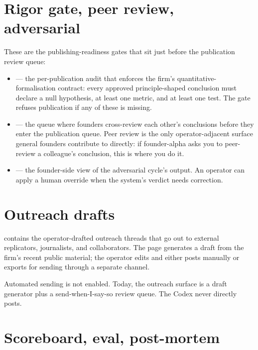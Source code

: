 \documentclass[11pt]{article}
\begin{document}
\section{Rigor gate, peer review, adversarial}

These are the publishing-readiness gates that sit just before the
publication review queue:

\begin{itemize}[leftmargin=*,itemsep=0.2em]
  \item {} --- the per-publication audit that enforces
        the firm's quantitative-formalisation contract: every approved
        principle-shaped conclusion must declare a null hypothesis,
        at least one metric, and at least one test. The gate refuses
        publication if any of these is missing.
  \item {} --- the queue where founders cross-review
        each other's conclusions before they enter the publication
        queue. Peer review is the only operator-adjacent surface
        general founders contribute to directly: if founder-alpha
        asks you to peer-review a colleague's conclusion, this is
        where you do it.
  \item {} --- the founder-side view of the
        adversarial cycle's output. An operator can apply a human
        override when the system's verdict needs correction.
\end{itemize}

\section{Outreach drafts}

 contains the operator-drafted outreach threads that go
out to external replicators, journalists, and collaborators. The page
generates a draft from the firm's recent public material; the
operator edits and either posts manually or exports for sending
through a separate channel.

\begin{preview}
Automated sending is not enabled. Today, the outreach surface is a
draft generator plus a send-when-I-say-so review queue. The Codex
never directly posts.
\end{preview}

\section{Scoreboard, eval, post-mortem}
\end{document}
